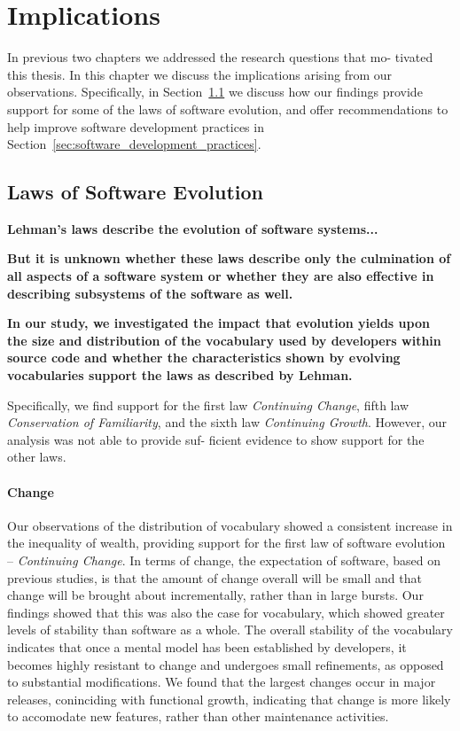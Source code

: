 \chapter{Implications} %
\label{cha:implications}

In previous two chapters we addressed the research questions that mo- tivated this thesis. In this chapter we discuss the implications arising from our observations. Specifically, in Section~\ref{sec:laws_of_software_evolution} we discuss how our findings provide support for some of the laws of software evolution, and offer recommendations to help improve software development practices in Section~\ref{sec:software_development_practices}.

\section{Laws of Software Evolution} %
\label{sec:laws_of_software_evolution}

\textbf{Lehman's laws describe the evolution of software systems...}

\textbf{But it is unknown whether these laws describe only the culmination of all aspects of a software system or whether they are also effective in describing subsystems of the software as well.}

\textbf{In our study, we investigated the impact that evolution yields upon the size and distribution of the vocabulary used by developers within source code and whether the characteristics shown by evolving vocabularies support the laws as described by Lehman.}

Specifically, we find support for the first law \emph{Continuing Change}, fifth law \emph{Conservation of Familiarity}, and the sixth law \emph{Continuing Growth}. However, our analysis was not able to provide suf- ficient evidence to show support for the other laws.

\subsubsection{Change} %
\label{ssub:change}

Our observations of the distribution of vocabulary showed a consistent increase in the inequality of wealth, providing support for the first law of software evolution -- \emph{Continuing Change}. In terms of change, the expectation of software, based on previous studies, is that the amount of change overall will be small and that change will be brought about incrementally, rather than in large bursts. Our findings showed that this was also the case for vocabulary, which showed greater levels of stability than software as a whole. The overall stability of the vocabulary indicates that once a mental model has been established by developers, it becomes highly resistant to change and undergoes small refinements, as opposed to substantial modifications. We found that the largest changes occur in major releases, coninciding with functional growth, indicating that change is more likely to accomodate new features, rather than other maintenance activities.

